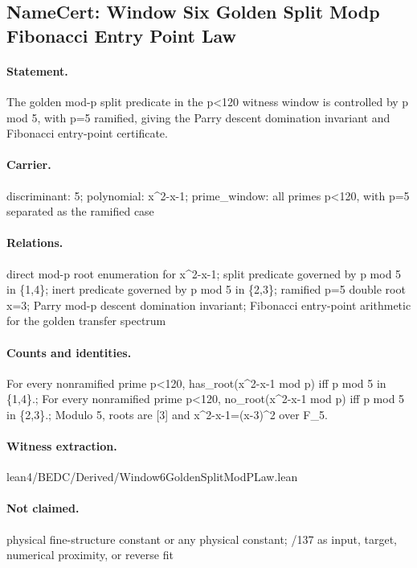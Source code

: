 \subsection{NameCert: Window Six Golden Split Modp Fibonacci Entry Point Law}
\label{sec:namecert-window6_golden_split_modp_fibonacci_entry_point_law_certificate}

\paragraph{Statement.} The golden mod-p split predicate in the p<120 witness window is controlled by p mod 5, with p=5 ramified, giving the Parry descent domination invariant and Fibonacci entry-point certificate.

\paragraph{Carrier.} discriminant: 5; polynomial: x\textasciicircum{}2-x-1; prime\_window: all primes p<120, with p=5 separated as the ramified case

\paragraph{Relations.} direct mod-p root enumeration for x\textasciicircum{}2-x-1; split predicate governed by p mod 5 in \{1,4\}; inert predicate governed by p mod 5 in \{2,3\}; ramified p=5 double root x=3; Parry mod-p descent domination invariant; Fibonacci entry-point arithmetic for the golden transfer spectrum

\paragraph{Counts and identities.} For every nonramified prime p<120, has\_root(x\textasciicircum{}2-x-1 mod p) iff p mod 5 in \{1,4\}.; For every nonramified prime p<120, no\_root(x\textasciicircum{}2-x-1 mod p) iff p mod 5 in \{2,3\}.; Modulo 5, roots are [3] and x\textasciicircum{}2-x-1=(x-3)\textasciicircum{}2 over F\_5.

\paragraph{Witness extraction.} lean4/BEDC/Derived/Window6GoldenSplitModPLaw.lean

\paragraph{Not claimed.} physical fine-structure constant or any physical constant; /137 as input, target, numerical proximity, or reverse fit
